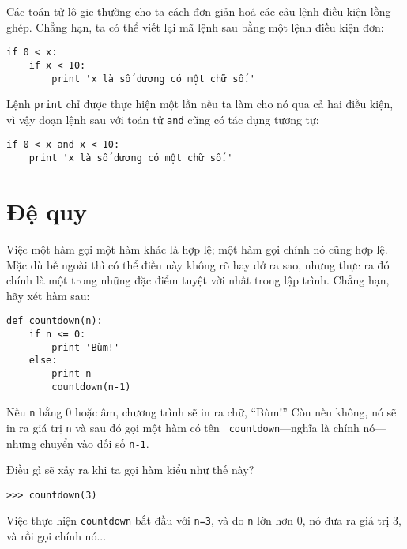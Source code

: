 \documentclass[11pt]{book}
\begin{document}
Các toán tử lô-gic thường cho ta cách đơn giản hoá các câu lệnh
điều kiện lồng ghép. Chẳng hạn, ta có thể viết lại mã lệnh sau
bằng một lệnh điều kiện đơn:

\beforeverb
\begin{verbatim}
if 0 < x:
    if x < 10:
        print 'x là số dương có một chữ số.'
\end{verbatim}
\afterverb
%

Lệnh {\tt print} chỉ được thực hiện một lần nếu ta làm cho nó qua cả
hai điều kiện, vì vậy đoạn lệnh sau với toán tử {\tt and} cũng có tác dụng 
tương tự:

\beforeverb
\begin{verbatim}
if 0 < x and x < 10:
    print 'x là số dương có một chữ số.'
\end{verbatim}
\afterverb




\section{Đệ quy}
\label{recursion}

Việc một hàm gọi một hàm khác là hợp lệ; một hàm gọi chính nó
cũng hợp lệ. Mặc dù bề ngoài thì có thể điều này không rõ hay dở
ra sao, nhưng thực ra đó chính là một trong những đặc điểm tuyệt
vời nhất trong lập trình.
Chẳng hạn, hãy xét hàm sau:

\beforeverb
\begin{verbatim}
def countdown(n):
    if n <= 0:
        print 'Bùm!'
    else:
        print n
        countdown(n-1)
\end{verbatim}
\afterverb
%
Nếu {\tt n} bằng 0 hoặc âm, chương trình sẽ in ra chữ, ``Bùm!''
Còn nếu không, nó sẽ in ra giá trị {\tt n} và sau đó gọi một hàm có tên {\tt
countdown}---nghĩa là chính nó---nhưng chuyển vào đối số {\tt n-1}.

Điều gì sẽ xảy ra khi ta gọi hàm kiểu như thế này?

\beforeverb
\begin{verbatim}
>>> countdown(3)
\end{verbatim}
\afterverb
%
Việc thực hiện {\tt countdown} bắt đầu với {\tt n=3}, và do 
{\tt n} lớn hơn 0, nó đưa ra giá trị 3, và rồi gọi chính nó...
\end{document}
